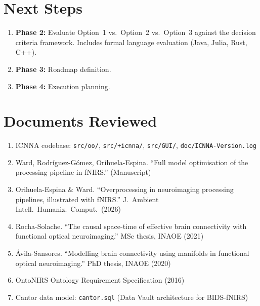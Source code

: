\documentclass[11pt,a4paper]{article}
\begin{document}
\section{Next Steps}

\begin{enumerate}
    \item \textbf{Phase 2:} Evaluate Option~1 vs.\ Option~2 vs.\ Option~3 against the decision criteria framework. Includes formal language evaluation (Java, Julia, Rust, C++).
    \item \textbf{Phase 3:} Roadmap definition.
    \item \textbf{Phase 4:} Execution planning.
\end{enumerate}

\section{Documents Reviewed}

\begin{enumerate}
    \item ICNNA codebase: \texttt{src/oo/}, \texttt{src/+icnna/}, \texttt{src/GUI/}, \texttt{doc/ICNNA-Version.log}
    \item Ward, Rodr\'iguez-G\'omez, Orihuela-Espina. ``Full model optimisation of the processing pipeline in fNIRS.'' (Manuscript)
    \item Orihuela-Espina \& Ward. ``Overprocessing in neuroimaging processing pipelines, illustrated with fNIRS.'' J.\ Ambient Intell.\ Humaniz.\ Comput.\ (2026)
    \item Rocha-Solache. ``The causal space-time of effective brain connectivity with functional optical neuroimaging.'' MSc thesis, INAOE (2021)
    \item \'Avila-Sansores. ``Modelling brain connectivity using manifolds in functional optical neuroimaging.'' PhD thesis, INAOE (2020)
    \item OntoNIRS Ontology Requirement Specification (2016)
    \item Cantor data model: \texttt{cantor.sql} (Data Vault architecture for BIDS-fNIRS)
\end{enumerate}
\end{document}
